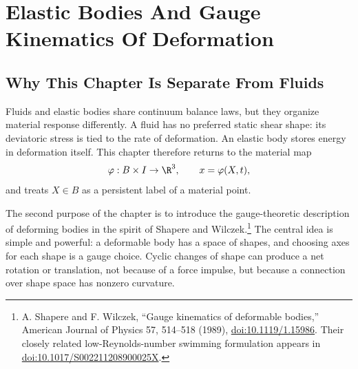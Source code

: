 \chapter{Elastic Bodies And Gauge Kinematics Of Deformation}
\label{chap:elastic-gauge}

\section{Why This Chapter Is Separate From Fluids}
\label{sec:elastic-vs-fluid}

Fluids and elastic bodies share continuum balance laws, but they organize
material response differently. A fluid has no preferred static shear shape: its
deviatoric stress is tied to the rate of deformation. An elastic body stores
energy in deformation itself. This chapter therefore returns to the material
map
\[
  \varphi:B\times I\to\R^3,
  \qquad
  x=\varphi(X,t),
\]
and treats \(X\in B\) as a persistent label of a material point.

The second purpose of the chapter is to introduce the gauge-theoretic
description of deforming bodies in the spirit of Shapere and Wilczek.\footnote{
A. Shapere and F. Wilczek, ``Gauge kinematics of deformable bodies,''
American Journal of Physics 57, 514--518 (1989),
\href{https://doi.org/10.1119/1.15986}{doi:10.1119/1.15986}. Their closely
related low-Reynolds-number swimming formulation appears in
\href{https://doi.org/10.1017/S002211208900025X}{doi:10.1017/S002211208900025X}.}
The central idea is simple and powerful: a deformable body has a space of
shapes, and choosing axes for each shape is a gauge choice. Cyclic changes of
shape can produce a net rotation or translation, not because of a force impulse,
but because a connection over shape space has nonzero curvature.

